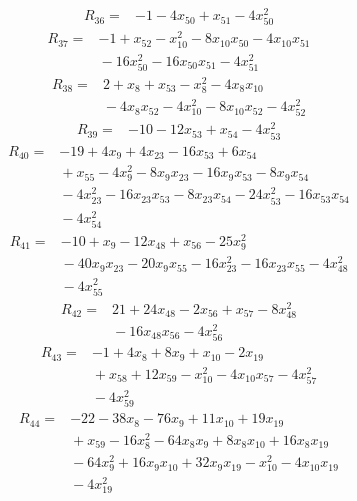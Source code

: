\begin{align*}
R_{36} ={}& -1 - 4x_{50} + x_{51} - 4x_{50}^{2}
\end{align*}
\begin{align*}
R_{37} ={}& -1 + x_{52} - x_{10}^{2} - 8x_{10} x_{50} - 4x_{10} x_{51} \\
&{} -16x_{50}^{2} - 16x_{50} x_{51} - 4x_{51}^{2}
\end{align*}
\begin{align*}
R_{38} ={}& 2 + x_{8} + x_{53} - x_{8}^{2} - 4x_{8} x_{10} \\
&{} -4x_{8} x_{52} - 4x_{10}^{2} - 8x_{10} x_{52} - 4x_{52}^{2}
\end{align*}
\begin{align*}
R_{39} ={}& -10 - 12x_{53} + x_{54} - 4x_{53}^{2}
\end{align*}
\begin{align*}
R_{40} ={}& -19 + 4x_{9} + 4x_{23} - 16x_{53} + 6x_{54} \\
&{} + x_{55} - 4x_{9}^{2} - 8x_{9} x_{23} - 16x_{9} x_{53} - 8x_{9} x_{54} \\
&{} -4x_{23}^{2} - 16x_{23} x_{53} - 8x_{23} x_{54} - 24x_{53}^{2} - 16x_{53} x_{54} \\
&{} -4x_{54}^{2}
\end{align*}
\begin{align*}
R_{41} ={}& -10 + x_{9} - 12x_{48} + x_{56} - 25x_{9}^{2} \\
&{} -40x_{9} x_{23} - 20x_{9} x_{55} - 16x_{23}^{2} - 16x_{23} x_{55} - 4x_{48}^{2} \\
&{} -4x_{55}^{2}
\end{align*}
\begin{align*}
R_{42} ={}& 21 + 24x_{48} - 2x_{56} + x_{57} - 8x_{48}^{2} \\
&{} -16x_{48} x_{56} - 4x_{56}^{2}
\end{align*}
\begin{align*}
R_{43} ={}& -1 + 4x_{8} + 8x_{9} + x_{10} - 2x_{19} \\
&{} + x_{58} + 12x_{59} - x_{10}^{2} - 4x_{10} x_{57} - 4x_{57}^{2} \\
&{} -4x_{59}^{2}
\end{align*}
\begin{align*}
R_{44} ={}& -22 - 38x_{8} - 76x_{9} + 11x_{10} + 19x_{19} \\
&{} + x_{59} - 16x_{8}^{2} - 64x_{8} x_{9} + 8x_{8} x_{10} + 16x_{8} x_{19} \\
&{} -64x_{9}^{2} + 16x_{9} x_{10} + 32x_{9} x_{19} - x_{10}^{2} - 4x_{10} x_{19} \\
&{} -4x_{19}^{2}
\end{align*}

